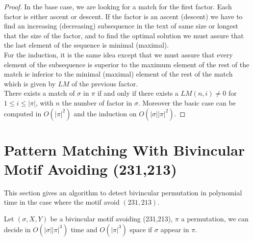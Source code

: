 \documentclass[a4paper]{llncs}
\newcommand{\ptext}{\pi}
\newcommand{\pmotif}{\sigma}
\newcommand{\x}{X}
\newcommand{\y}{Y}
\newcommand{\bmotif}{(\sigma,\x,\y)}
\newcounter{num}
\begin{document}
\begin{proof}
In the base case, 
we are looking for a match for the first factor.
Each factor is either ascent or descent.
If the factor is an ascent (descent)
we have to find an increasing (decreasing) subsequence
in the text of same size or longest that 
the size of the factor,
and to find the optimal solution 
we must assure that the last element
of the sequence is minimal (maximal).\\
For the induction, it is the same idea
except that we must assure that 
every element of the subsequence is superior 
to the maximum element of the rest of the match
ie inferior to the minimal (maximal) element of the rest of the match
which is given by $LM$ of
the previous factor.\\

There exists a match of $\pmotif$ in $\ptext$ if and only if
there exists a $LM(n,i)\neq 0$ for $1 \leq i \leq |\ptext|$,
with $n$ the number of factor in $\pmotif$.
Moreover the basic case can be computed in $O(|\ptext|^2)$
and the induction on $O(|\pmotif||\ptext|^2)$.
\end{proof}
					

\section{Pattern Matching With Bivincular Motif Avoiding (231,213)}	
\label{section:bivincular}

This section gives an algorithm to detect bivincular permutation in polynomial time in the case where the motif avoid $(231,213)$.

			\begin{proposition}
			Let $\bmotif$ be a bivincular motif 
			avoiding (231,213), 
			$\ptext$ a permutation,
			we can decide in $O(|\pmotif||\ptext|^3)$ time
			and $O(|\ptext|^3)$ space
			if $\pmotif$ 
			appear in $\ptext$.
			\end{proposition}
					
\end{document}

